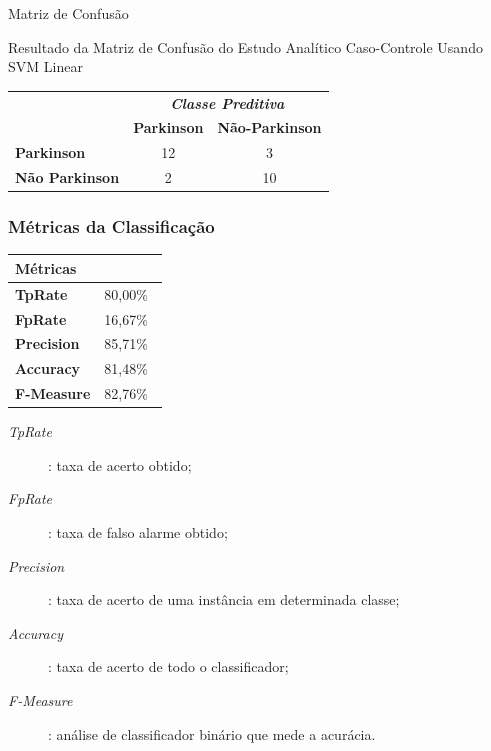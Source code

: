 \documentclass{beamer}
\begin{document}
\begin{frame}{Matriz de Confusão}
	\begin{block}{Resultado da Matriz de Confusão do Estudo Analítico Caso-Controle Usando SVM Linear}
\begin{table}[!htbp]
		\label{table:resultadomatrizconfusaosvm}
		\centering
		\begin{tabular}{l|c|c|}
		\cline{2-3}
		\multicolumn{1}{c}{}                         & \multicolumn{2}{|c|}{\textit{\textbf{Classe Preditiva}}} \\ \cline{2-3} 
																								 & \textbf{Parkinson}      & \textbf{Não-Parkinson}         \\ \hline
		\multicolumn{1}{|l|}{\textbf{Parkinson}} & 12       & 3           \\ \hline
		\multicolumn{1}{|l|}{\textbf{Não Parkinson}}     & 2           & 10     \\ \hline
		\end{tabular}
\end{table}
	\end{block}
\end{frame}

\begin{frame}
   \frametitle{Métricas da Classificação}
   \begin{block}{}
   		\begin{table}[!htbp]
				\label{table:metricasmatrizconfusao}
				\centering
				\begin{tabular}{|l|r|}
				\hline
				\multicolumn{2}{|l|}{\textbf{Métricas}} \\ \hline
				\textbf{TpRate}                    & 80,00$\%$\                 \\ \hline
				\textbf{FpRate}                    & 16,67$\%$\                \\ \hline
				\textbf{Precision}                 & 85,71$\%$\                \\ \hline
				\textbf{Accuracy}                  & 81,48$\%$\                \\ \hline
				\textbf{F-Measure}                 & 82,76$\%$\                \\ \hline
				\end{tabular}
				\end{table}
	\end{block}
     \begin{block}{}
				\begin{description}
				\item [\textit{TpRate}]: taxa de acerto obtido;
				\item [\textit{FpRate}]: taxa de falso alarme obtido;
				\item [\textit{Precision}]: taxa de acerto de uma instância em determinada classe;
				\item [\textit{Accuracy}]: taxa de acerto de todo o classificador;
				\item [\textit{F-Measure}]: análise de classificador binário que mede a acurácia.
				\end{description}
    \end{block}
\end{frame}
\end{document}

